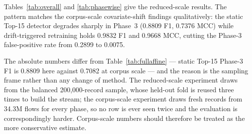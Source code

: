 \documentclass[11pt,a4paper]{article}
\begin{document}
Tables~\ref{tab:overall} and \ref{tab:phasewise} give the reduced-scale results.
The pattern matches the corpus-scale covariate-shift findings qualitatively: the
static Top-15 detector degrades sharply in Phase~3 (0.8809 F1, 0.7376 MCC) while
drift-triggered retraining holds 0.9832 F1 and 0.9668 MCC, cutting the Phase-3
false-positive rate from 0.2899 to 0.0075.

The absolute numbers differ from Table~\ref{tab:fullaffine} --- static Top-15
Phase-3 F1 is 0.8809 here against 0.7082 at corpus scale --- and the reason is
the sampling frame rather than any change of method. The reduced-scale
experiment draws from the balanced 200{,}000-record sample, whose held-out fold
is reused three times to build the stream; the corpus-scale experiment draws
fresh records from 34.3M flows for every phase, so no row is ever seen twice and
the evaluation is correspondingly harder. Corpus-scale numbers should therefore
be treated as the more conservative estimate.

\begin{table}[!ht]
\centering
\caption{Three-seed overall concept-drift evaluation (mean $\pm$
standard deviation). Seeds vary the forest's training randomness on a
single fixed split; see Section~\ref{sec:protocol}. ARF uses per-tree
internal drift detectors and background learners rather than discrete
retraining events, and learns continuously from every stream instance.}
\label{tab:overall}
\small
{}
\end{table}
\end{document}
